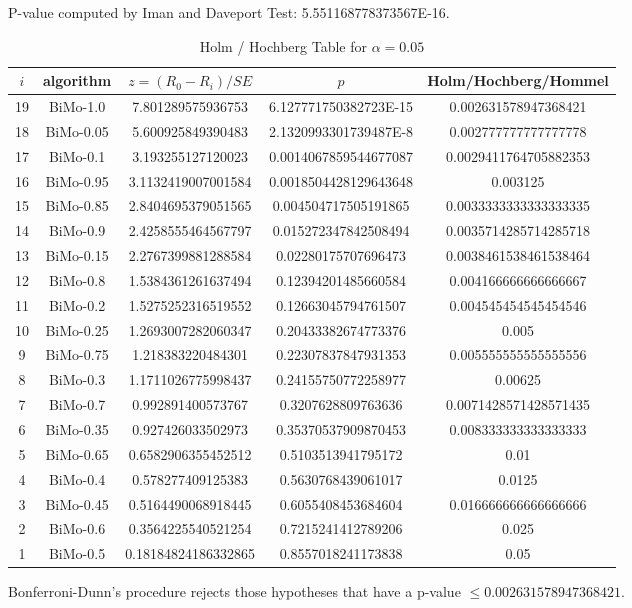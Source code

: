 \documentclass[a4paper,10pt]{article}
\begin{document}
\begin{landscape}
P-value computed by Iman and Daveport Test: 5.551168778373567E-16.\newline

\begin{table}[!htp]
\centering\tiny
\caption{Holm / Hochberg Table for $\alpha=0.05$}
\begin{tabular}{ccccc}
$i$&algorithm&$z=(R_0 - R_i)/SE$&$p$&Holm/Hochberg/Hommel\\
\hline
19&BiMo-1.0&7.801289575936753&6.127771750382723E-15&0.002631578947368421\\
18&BiMo-0.05&5.600925849390483&2.1320993301739487E-8&0.002777777777777778\\
17&BiMo-0.1&3.193255127120023&0.0014067859544677087&0.0029411764705882353\\
16&BiMo-0.95&3.1132419007001584&0.0018504428129643648&0.003125\\
15&BiMo-0.85&2.8404695379051565&0.004504717505191865&0.0033333333333333335\\
14&BiMo-0.9&2.4258555464567797&0.015272347842508494&0.0035714285714285718\\
13&BiMo-0.15&2.2767399881288584&0.02280175707696473&0.0038461538461538464\\
12&BiMo-0.8&1.5384361261637494&0.12394201485660584&0.004166666666666667\\
11&BiMo-0.2&1.5275252316519552&0.12663045794761507&0.004545454545454546\\
10&BiMo-0.25&1.2693007282060347&0.20433382674773376&0.005\\
9&BiMo-0.75&1.218383220484301&0.22307837847931353&0.005555555555555556\\
8&BiMo-0.3&1.1711026775998437&0.24155750772258977&0.00625\\
7&BiMo-0.7&0.992891400573767&0.3207628809763636&0.0071428571428571435\\
6&BiMo-0.35&0.927426033502973&0.35370537909870453&0.008333333333333333\\
5&BiMo-0.65&0.6582906355452512&0.5103513941795172&0.01\\
4&BiMo-0.4&0.578277409125383&0.5630768439061017&0.0125\\
3&BiMo-0.45&0.5164490068918445&0.6055408453684604&0.016666666666666666\\
2&BiMo-0.6&0.3564225540521254&0.7215241412789206&0.025\\
1&BiMo-0.5&0.18184824186332865&0.8557018241173838&0.05\\
\hline
\end{tabular}
\end{table}
Bonferroni-Dunn's procedure rejects those hypotheses that have a p-value $\le0.002631578947368421$.



\end{landscape}
\end{document}
